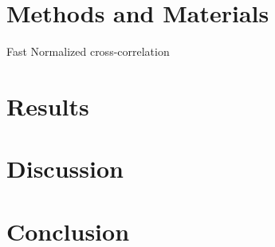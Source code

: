 \section{Methods and Materials}



Fast Normalized cross-correlation \citet{yoo_fast_2009}


\section{Results}











\section{Discussion}

\section{Conclusion}